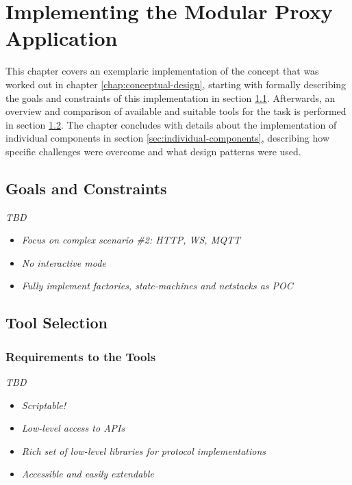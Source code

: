 \chapter{Implementing the Modular Proxy Application}
\label{chap:implementation}
This chapter covers an exemplaric implementation of the concept that was worked out in chapter \ref{chap:conceptual-design}, starting with formally describing the goals and constraints of this implementation in section \ref{sec:goals-constraints}. Afterwards, an overview and comparison of available and suitable tools for the task is performed in section \ref{sec:tool-selection}. The chapter concludes with details about the implementation of individual components in section \ref{sec:individual-components}, describing how specific challenges were overcome and what design patterns were used.

\section{Goals and Constraints}
\label{sec:goals-constraints}
\emph{TBD} %
\begin{itemize}
    \item \emph{Focus on complex scenario \#2: HTTP, WS, MQTT}
    \item \emph{No interactive mode}
    \item \emph{Fully implement factories, state-machines and netstacks as POC}
\end{itemize}

\section{Tool Selection}
\label{sec:tool-selection}

\subsection{Requirements to the Tools}
\emph{TBD} %
\begin{itemize}
    \item \emph{Scriptable!}
    \item \emph{Low-level access to APIs}
    \item \emph{Rich set of low-level libraries for protocol implementations}
    \item \emph{Accessible and easily extendable}
\end{itemize}

